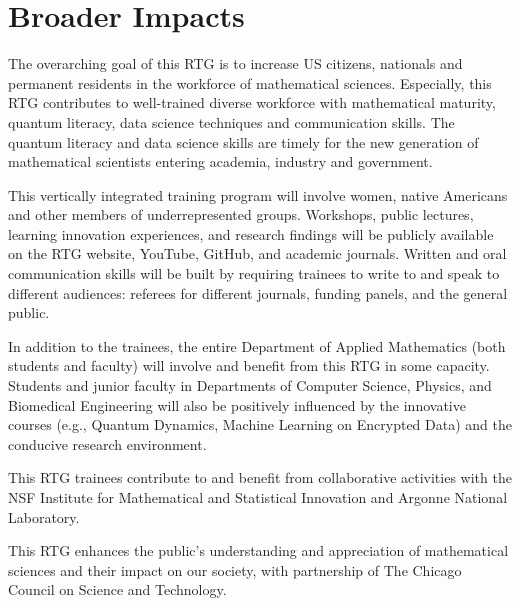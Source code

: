 \documentclass[11pt]{NSFamsart}
\begin{document}
\section{Broader Impacts} 

 

The overarching goal of this RTG is to increase US citizens, nationals and permanent residents in the workforce of  mathematical sciences. Especially, this RTG   contributes to  well-trained    diverse    workforce with mathematical maturity, quantum literacy,   data science techniques and communication skills.  The quantum literacy  and data science skills are   timely for the new  generation of mathematical scientists entering academia, industry and government.
   

This vertically integrated training program will involve women, native Americans and other members of underrepresented groups. Workshops, public lectures, learning innovation experiences, and research findings will be publicly available on the  RTG website, YouTube, GitHub, and academic journals. Written and oral communication skills will be built by requiring trainees to write to and speak to different audiences: referees for different journals, funding panels, and the general public. 

In addition to the   trainees, the entire Department of Applied Mathematics (both students and faculty) will   involve and benefit from this RTG in some capacity.    Students and junior faculty in Departments of Computer Science, Physics, and Biomedical Engineering will also be positively influenced by the innovative courses (e.g., Quantum Dynamics, Machine Learning on Encrypted Data) and the conducive research environment. 
 
This RTG trainees contribute to and benefit from collaborative activities with the NSF Institute for Mathematical and Statistical Innovation  and Argonne National Laboratory. 

This RTG enhances the public’s understanding and appreciation of mathematical sciences     and their impact on our society, with partnership of The Chicago Council on Science and Technology. 
 
\end{document}

